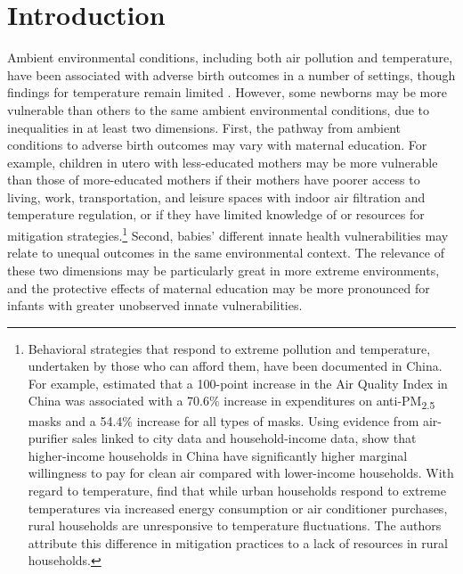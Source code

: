 
\section{Introduction}

Ambient environmental conditions, including both air pollution and temperature, have been associated with adverse birth outcomes in a number of settings, though findings for temperature remain limited \autocite{shah_air_2011, stieb_ambient_2012, currie_pollution_2013, kloog_using_2015, zhang_temperature_2017, klepac_ambient_2018, melody_maternal_2019, cho_ambient_2020, decicca_when_2020}.  However, some newborns may be more vulnerable than others to the same ambient environmental conditions, due to inequalities in at least two dimensions. First, the pathway from ambient conditions to adverse birth outcomes may vary with maternal education. For example, children in utero with less-educated mothers may be more vulnerable than those of more-educated mothers if their mothers have poorer access to living, work, transportation, and leisure spaces with indoor air filtration and temperature regulation, or if they have limited knowledge of or resources for mitigation strategies.\footnote{Behavioral strategies that respond to extreme pollution and temperature, undertaken by those who can afford them, have been documented in China.  For example, \textcite[518]{zhang_air_2018} estimated that a 100-point increase in the Air Quality Index in China was associated with a  70.6\% increase in expenditures on anti-PM\textsubscript{2.5} masks and a 54.4\% increase for all types of masks. Using evidence from air-purifier sales linked to city data and household-income data, \textcite{ito_willingness_2020} show that higher-income households in China have significantly higher marginal willingness to pay for clean air compared with lower-income households. With regard to temperature, \textcite{yu_temperature_2019} find that while urban households respond to extreme temperatures via increased energy consumption or air conditioner purchases, rural households are unresponsive to temperature fluctuations. The authors attribute this difference in mitigation practices to a lack of resources in rural households.} Second, babies' different innate health vulnerabilities may relate to unequal outcomes in the same environmental context. The relevance of these two dimensions may be particularly great in more extreme environments, and the protective effects of maternal education may be more pronounced for infants with greater unobserved innate vulnerabilities. 

